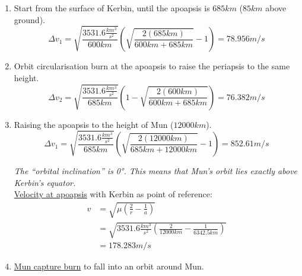 \documentclass[12pt,paper=A4,numbers=noenddot,bibliography=totoc,listof=totoc,DIV=11,BCOR=1mm]{scrreprt}
\begin{document}
\begin{enumerate}
\item Start from the surface of Kerbin, until the apoapsis is $685km$ ($85km$ above ground).
\begin{equation*}
\Delta v_{1} = \sqrt{\frac{3531.6 \frac{km^{3}}{s^{2}}}{600km}} \left( \sqrt{\frac{2(685km)}{600km+685km}}-1 \right)      = 78.956 m/s
\end{equation*}
\item Orbit circularisation burn at the apoapsis to raise the periapsis to the same height.
\begin{equation*}
\Delta v_{2} = \sqrt{\frac{3531.6 \frac{km^{3}}{s^{2}}}{685km}} \left( 1-\sqrt{\frac{2(600km)}{600km+685km}} \right)      = 76.382 m/s
\end{equation*}
\item Raising the apoapsis to the height of Mun ($12000km$).\\
\begin{equation*}
\Delta v_{1} = \sqrt{\frac{3531.6 \frac{km^{3}}{s^{2}}}{685km}} \left( \sqrt{\frac{2(12000km)}{685km+12000km}}-1 \right) = 852.61 m/s
\end{equation*}

\emph{The ``orbital inclination'' is 0°. This means that Mun's orbit lies exactly above Kerbin's equator.}\\

\hyperlink{velocityatorbitposition}{Velocity at apoapsis} with Kerbin as point of reference:
\begin{equation*}\label{eq:velatorbitpos} 
\begin{split}
v &= \sqrt{\mu \left( \frac{2}{r} - \frac{1}{a} \right) } \\
  &= \sqrt{3531.6 \frac{km^{3}}{s^{2}} \left( \frac{2}{12000km} - \frac{1}{6342.5km} \right) } \\
  &= 178.283m/s
\end{split}
\end{equation*}

\item \href{https://en.wikipedia.org/wiki/Orbit_insertion}{Mun capture burn} to fall into an orbit around Mun.\\


\end{enumerate}
\end{document}
